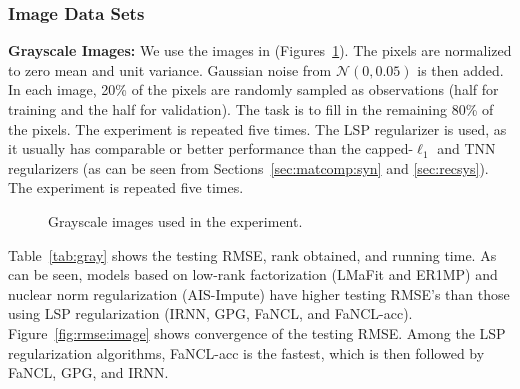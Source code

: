 \documentclass[10pt,journal,compsoc]{IEEEtran}
\begin{document}
\subsubsection{Image Data Sets}
\label{sec:expgray}

\noindent
\textbf{Grayscale Images:}
We use the images in \cite{hu2013fast}
(Figures~\ref{fig:gray}).
The
pixels are normalized
to zero mean and unit variance.
Gaussian noise from $\mathcal{N}(0, 0.05)$ 
is then added.
In each  image,
20\% of the pixels 
are randomly sampled as observations (half for training and the half for validation).
The task is to fill in the remaining 80\% of the pixels.
The experiment is repeated five times.
The LSP regularizer is used, as 
it usually has comparable or better performance than the capped-$\ell_1$
and TNN regularizers (as can be seen from Sections~\ref{sec:matcomp:syn} and \ref{sec:recsys}).
The experiment is repeated five times.

\begin{figure}[ht]
\centering
\quad
{}
\quad
{}

\vspace{-10px}
\caption{Grayscale images used in the experiment.}
\label{fig:gray}
\end{figure}

Table~\ref{tab:gray} shows
the testing RMSE, rank obtained, and running time.
As can be seen, models based on low-rank
factorization (\textsf{LMaFit} and \textsf{ER1MP})
and nuclear norm regularization (\textsf{AIS-Impute})
have higher testing RMSE's than those using LSP regularization (\textsf{IRNN}, \textsf{GPG}, \textsf{FaNCL}, and \textsf{FaNCL-acc}).
Figure~\ref{fig:rmse:image}
shows 
convergence of the testing RMSE.
Among the LSP regularization 
algorithms,
\textsf{FaNCL-acc} is the fastest, which is then followed by
\textsf{FaNCL}, \textsf{GPG}, and \textsf{IRNN}.
\end{document}
